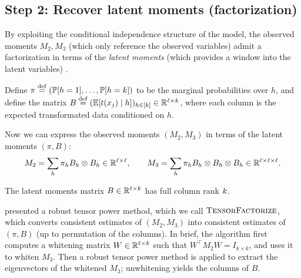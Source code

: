\subsection{Step 2: Recover latent moments (factorization)}
\label{sec:factorization}

By exploiting the conditional independence structure of the model, the observed
moments $M_2,M_3$ (which only reference the observed variables) admit a
factorization in terms of the \emph{latent moments}
(which provides a window into the latent variables) \cite{anandkumar12moments}.

Define
$\pi \stackrel{\rm def}{=} (\mathbb{P}[h=1], \dots, \mathbb{P}[h=k])$ to be the marginal probabilities
over $h$,
and define the matrix $B \stackrel{\rm def}{=} (\mathbb{E}[t(x_j) \mid h])_{h \in [k]} \in \mathbb{R}^{\ell \times k}$,
where each column is the expected transformated data conditioned on $h$.

Now we can express the observed moments $(M_2,M_3)$ in terms of the latent moments $(\pi,B)$:
\begin{align}
  M_2 = \sum_h \pi_h B_h \otimes B_h \in \mathbb{R}^{\ell \times \ell}, \quad\quad
  M_3 = \sum_h \pi_h B_h \otimes B_h \otimes B_h \in \mathbb{R}^{\ell \times \ell \times \ell}.
\end{align}
\begin{assumption}
  The latent moments matrix $B \in \mathbb{R}^{\ell \times k}$ has full column rank $k$.
\end{assumption}

\citep{anandkumar13tensor} presented a robust tensor power method, which we call $\text{\sc TensorFactorize}$,
which converts consistent estimates of $(M_2,M_3)$ into consistent estimates of $(\pi, B)$ (up to permutation of the columns).
In brief, the algorithm first computes a whitening matrix $W \in \mathbb{R}^{\ell \times k}$ such that $W^\top M_2 W = I_{k \times k}$,
and uses it to whiten $M_3$.  Then a robust tensor power method is applied to
extract the eigenvectors of the whitened $M_3$;
unwhitening yields the columns of $B$.

